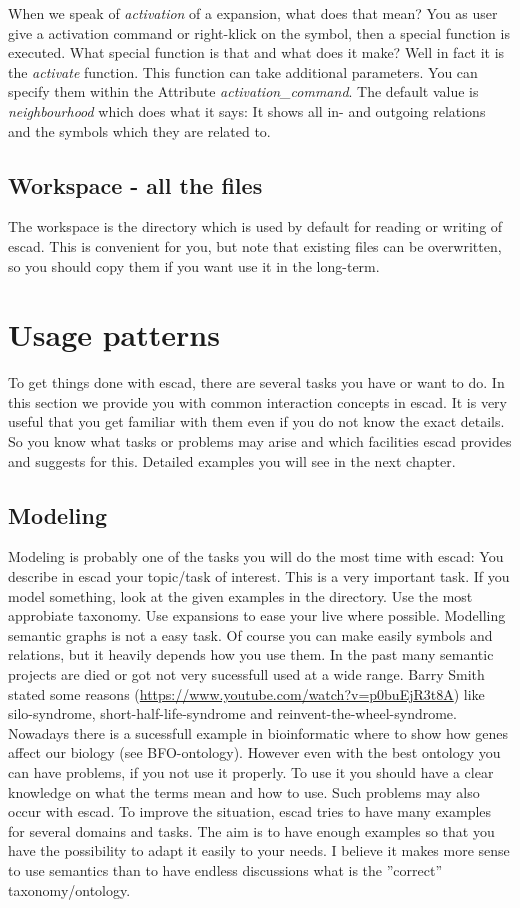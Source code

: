 \documentclass[a4paper, 12pt, openany]{scrbook}
\begin{document}
When we speak of \emph{activation} of a expansion, what does that mean? You as user give a activation command or right-klick on the symbol, then a special function is executed. What special function is that and what does it make? Well in fact it is the \emph{activate} function. This function can take additional parameters. You can specify them within the Attribute \emph{activation\_command}. The default value is \emph{neighbourhood} which does what it says: It shows all in- and outgoing relations and the symbols which they are related to.
\subsection{Workspace - all the files}
The workspace is the directory which is used by default for reading or writing of escad. This is convenient for you, but note that existing files can be overwritten, so you should copy them if you want use it in the long-term.
\section{Usage patterns}
To get things done with escad, there are several tasks you have or want to do. In this section we provide you with common interaction concepts in escad. It is very useful that you get familiar with them even if you do not know the exact details. So you know what tasks or problems may arise and which facilities escad provides and suggests for this. Detailed examples you will see in the next chapter.
\subsection{Modeling}
Modeling is probably one of the tasks you will do the most time with escad: You describe in escad your topic/task of interest. This is a very important task. If you model something, look at the given examples in the  directory. Use the most approbiate taxonomy. Use expansions to ease your live where possible.
Modelling semantic graphs is not a easy task. Of course you can make easily symbols and relations, but it heavily depends how you use them. In the past many semantic projects are died or got not very sucessfull used at a wide range. Barry Smith stated some reasons (\url{https://www.youtube.com/watch?v=p0buEjR3t8A}) like silo-syndrome, short-half-life-syndrome and reinvent-the-wheel-syndrome. Nowadays there is a sucessfull example in bioinformatic where to show how genes affect our biology (see BFO-ontology). However even with the best ontology you can have problems, if you not use it properly. To use it you should have a clear knowledge on what the terms mean and how to use.
Such problems may also occur with escad. To improve the situation, escad tries to have many examples for several domains and tasks. The aim is to have enough examples so that you have the possibility to adapt it easily to your needs. I believe it makes more sense to use semantics than to have endless discussions what is the ''correct'' taxonomy/ontology.
\end{document}

